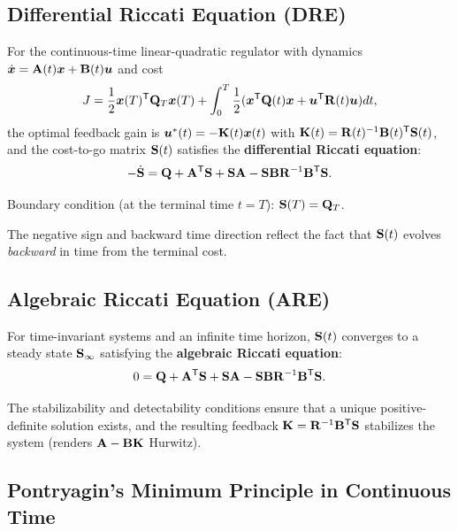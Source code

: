 \subsection{Differential Riccati Equation (DRE)}

For the continuous-time linear-quadratic regulator with dynamics $\dot{\bm{x}} = \mathbf{A}(t)\bm{x} + \mathbf{B}(t)\bm{u}$
and cost
\begin{equation}
J = \frac{1}{2}\bm{x}(T)^{\mathsf{T}}\mathbf{Q}_T\bm{x}(T) + \int_0^T \frac{1}{2}(\bm{x}^{\mathsf{T}}\mathbf{Q}(t)\bm{x} + \bm{u}^{\mathsf{T}}\mathbf{R}(t)\bm{u}) dt,
\label{eq:ch5:ct-cost}
\end{equation}
the optimal feedback gain is $\bm{u}^*(t) = -\mathbf{K}(t)\bm{x}(t)$ with $\mathbf{K}(t) = \mathbf{R}(t)^{-1}\mathbf{B}(t)^{\mathsf{T}}\mathbf{S}(t)$,
and the cost-to-go matrix $\mathbf{S}(t)$ satisfies the \textbf{differential Riccati equation}:
\begin{equation}
-\dot{\mathbf{S}} = \mathbf{Q} + \mathbf{A}^{\mathsf{T}}\mathbf{S} + \mathbf{S}\mathbf{A} - \mathbf{S}\mathbf{B}\mathbf{R}^{-1}\mathbf{B}^{\mathsf{T}}\mathbf{S}.
\label{eq:ch5:DRE}
\end{equation}

Boundary condition (at the terminal time $t = T$): $\mathbf{S}(T) = \mathbf{Q}_T$.

The negative sign and backward time direction reflect the fact that $\mathbf{S}(t)$ evolves \emph{backward} in time from
the terminal cost.

\subsection{Algebraic Riccati Equation (ARE)}

For time-invariant systems and an infinite time horizon, $\mathbf{S}(t)$ converges to a steady state $\mathbf{S}_\infty$
satisfying the \textbf{algebraic Riccati equation}:
\begin{equation}
0 = \mathbf{Q} + \mathbf{A}^{\mathsf{T}}\mathbf{S} + \mathbf{S}\mathbf{A} - \mathbf{S}\mathbf{B}\mathbf{R}^{-1}\mathbf{B}^{\mathsf{T}}\mathbf{S}.
\label{eq:ch5:ARE}
\end{equation}

The stabilizability and detectability conditions ensure that a unique positive-definite solution exists, and the
resulting feedback $\mathbf{K} = \mathbf{R}^{-1}\mathbf{B}^{\mathsf{T}}\mathbf{S}$ stabilizes the system (renders $\mathbf{A} - \mathbf{B}\mathbf{K}$
Hurwitz).

\subsection{Pontryagin's Minimum Principle in Continuous Time}


